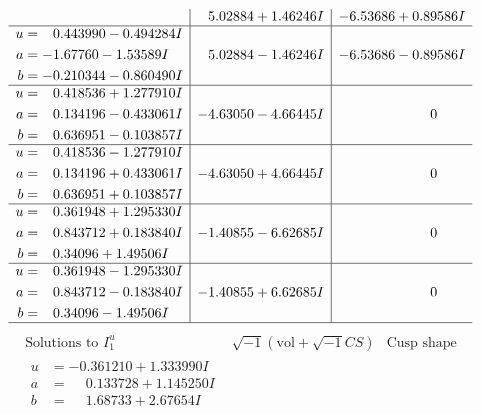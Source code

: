 \documentclass[1p]{elsarticle_modified}
\theoremstyle{definition}
\newcommand{\I}{\sqrt{-1}}
\begin{document}
$$\begin{array}{c|c|c}
 & \phantom{-}5.02884 + 1.46246 I & -6.53686 + 0.89586 I \\ \hline\begin{aligned}
u &= \phantom{-}0.443990 - 0.494284 I \\
a &= -1.67760 - 1.53589 I \\
b &= -0.210344 - 0.860490 I\end{aligned}
 & \phantom{-}5.02884 - 1.46246 I & -6.53686 - 0.89586 I \\ \hline\begin{aligned}
u &= \phantom{-}0.418536 + 1.277910 I \\
a &= \phantom{-}0.134196 - 0.433061 I \\
b &= \phantom{-}0.636951 - 0.103857 I\end{aligned}
 & -4.63050 - 4.66445 I & \phantom{-0.000000 } 0 \\ \hline\begin{aligned}
u &= \phantom{-}0.418536 - 1.277910 I \\
a &= \phantom{-}0.134196 + 0.433061 I \\
b &= \phantom{-}0.636951 + 0.103857 I\end{aligned}
 & -4.63050 + 4.66445 I & \phantom{-0.000000 } 0 \\ \hline\begin{aligned}
u &= \phantom{-}0.361948 + 1.295330 I \\
a &= \phantom{-}0.843712 + 0.183840 I \\
b &= \phantom{-}0.34096 + 1.49506 I\end{aligned}
 & -1.40855 - 6.62685 I & \phantom{-0.000000 } 0 \\ \hline\begin{aligned}
u &= \phantom{-}0.361948 - 1.295330 I \\
a &= \phantom{-}0.843712 - 0.183840 I \\
b &= \phantom{-}0.34096 - 1.49506 I\end{aligned}
 & -1.40855 + 6.62685 I & \phantom{-0.000000 } 0\\
 \hline 
 \end{array}$$\newpage$$\begin{array}{c|c|c}  
\text{Solutions to }I^u_{1}& \I (\text{vol} + \sqrt{-1}CS) & \text{Cusp shape}\\
 \hline 
\begin{aligned}
u &= -0.361210 + 1.333990 I \\
a &= \phantom{-}0.133728 + 1.145250 I \\
b &= \phantom{-}1.68733 + 2.67654 I\end{aligned}

\end{array}$$
\end{document}
